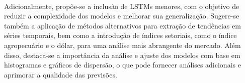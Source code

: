 \paragraph{} Adicionalmente, propõe-se a inclusão de \acp{LSTM} menores, com o objetivo de reduzir a complexidade dos modelos e melhorar sua generalização. Sugere-se também a aplicação de métodos alternativos para extração de tendências em séries temporais, bem como a introdução de índices setoriais, como o índice agropecuário e o dólar, para uma análise mais abrangente do mercado. Além disso, destaca-se a importância da análise e ajuste dos modelos com base em histogramas e gráficos de dispersão, o que pode fornecer análises adicionais e aprimorar a qualidade das previsões.